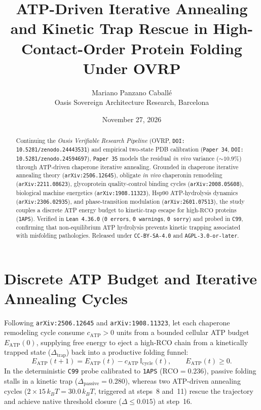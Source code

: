 \documentclass[11pt,a4paper]{article}
\title{ATP-Driven Iterative Annealing and Kinetic Trap Rescue in High-Contact-Order Protein Folding Under OVRP}
\author{Mariano Panzano Caball\'e \\ \small Oasis Sovereign Architecture Research, Barcelona}
\date{November 27, 2026}
\begin{document}
\maketitle

\begin{abstract}
Continuing the \emph{Oasis Verifiable Research Pipeline} (OVRP, \texttt{DOI: 10.5281/zenodo.24443531}) and empirical two-state PDB calibration (\texttt{Paper~34}, \texttt{DOI: 10.5281/zenodo.24594697}), \texttt{Paper~35} models the residual \emph{in vivo} variance ($\sim 10.9\%$) through ATP-driven chaperone iterative annealing. Grounded in chaperone iterative annealing theory (\texttt{arXiv:2506.12645}), obligate \emph{in vivo} chaperonin remodeling (\texttt{arXiv:2211.08623}), glycoprotein quality-control binding cycles (\texttt{arXiv:2008.05608}), biological machine energetics (\texttt{arXiv:1908.11323}), Hsp90 ATP-hydrolysis dynamics (\texttt{arXiv:2306.02935}), and phase-transition modulation (\texttt{arXiv:2601.07513}), the study couples a discrete ATP energy budget to kinetic-trap escape for high-$\mathrm{RCO}$ proteins (\texttt{1APS}). Verified in \texttt{Lean~4.36.0} (\texttt{0~errors}, \texttt{0~warnings}, \texttt{0~sorry}) and probed in \texttt{C99}, confirming that non-equilibrium ATP hydrolysis prevents kinetic trapping associated with misfolding pathologies. Released under \texttt{CC-BY-SA-4.0} and \texttt{AGPL-3.0-or-later}.
\end{abstract}

\section{Discrete ATP Budget and Iterative Annealing Cycles}
Following \texttt{arXiv:2506.12645} and \texttt{arXiv:1908.11323}, let each chaperone remodeling cycle consume $c_{\mathrm{ATP}} > 0$ units from a bounded cellular ATP budget $E_{\mathrm{ATP}}(0)$, supplying free energy to eject a high-$\mathrm{RCO}$ chain from a kinetically trapped state ($\Delta_{\mathrm{trap}}$) back into a productive folding funnel:
\begin{equation}
E_{\mathrm{ATP}}(t+1) = E_{\mathrm{ATP}}(t) - c_{\mathrm{ATP}}\,\mathbb{I}_{\mathrm{cycle}}(t), \qquad E_{\mathrm{ATP}}(t) \ge 0.
\end{equation}
In the deterministic \texttt{C99} probe calibrated to \texttt{1APS} ($\mathrm{RCO} = 0.236$), passive folding stalls in a kinetic trap ($\Delta_{\mathrm{passive}} = 0.280$), whereas two ATP-driven annealing cycles ($2 \times 15\,k_B T = 30.0\,k_B T$, triggered at steps~8 and~11) rescue the trajectory and achieve native threshold closure ($\Delta \le 0.015$) at step~16.
\end{document}
